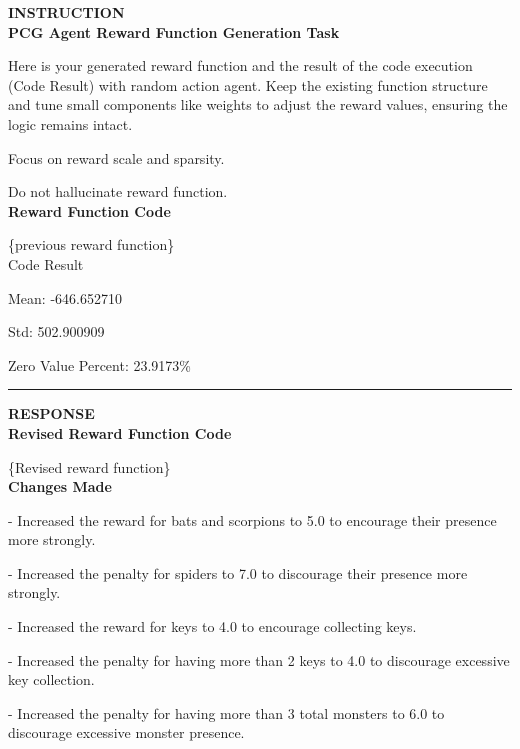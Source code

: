 \begin{tcolorbox}[colback=white, colframe=gray, title=Self-Alignment, breakable]
{\textbf{\MakeUppercase{Instruction}}}  \\

\textbf{PCG Agent Reward Function Generation Task}

Here is your generated reward function and the result of the code execution (Code Result) with random action agent.
Keep the existing function structure and tune small components like weights to adjust the reward values, ensuring the logic remains intact. 

Focus on reward scale and sparsity.  

Do not hallucinate reward function.\\

\textbf{Reward Function Code}

\{previous reward function\} \\


Code Result

Mean: -646.652710

Std: 502.900909

Zero Value Percent: 23.9173\% 

\medskip
\noindent\textcolor{gray}{\rule{\linewidth}{0.4pt}}

{\textbf{\MakeUppercase{Response}}}  \\

\textbf{Revised Reward Function Code}

\{Revised reward function\} 
\\

\textbf{Changes Made}

- Increased the reward for bats and scorpions to 5.0 to encourage their presence more strongly.

- Increased the penalty for spiders to 7.0 to discourage their presence more strongly.

- Increased the reward for keys to 4.0 to encourage collecting keys.

- Increased the penalty for having more than 2 keys to 4.0 to discourage excessive key collection.

- Increased the penalty for having more than 3 total monsters to 6.0 to discourage excessive monster presence.

\end{tcolorbox}

\vspace{1em}

